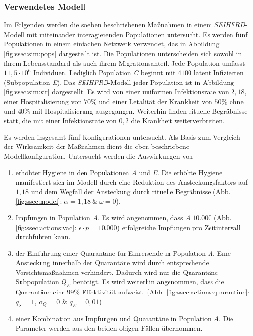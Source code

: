 \subsubsection{Verwendetes Modell}
Im Folgenden werden die soeben beschriebenen Maßnahmen in einem \emph{SEIHFRD}-Modell mit miteinander interagierenden Populationen untersucht. Es werden fünf Populationen in einem einfachen Netzwerk verwendet, das in Abbildung \ref{fig:ssec:sim:pops} dargestellt ist. Die Populationen unterscheiden sich sowohl in ihrem Lebensstandard als auch ihrem Migrationsanteil. Jede Population umfasst $11,5\cdot 10^6$ Individuen. Lediglich Population \emph{C} beginnt mit $4100$ latent Infizierten (Subpopulation \emph{E}). Das \emph{SEIHFRD}-Modell jeder Population ist in Abbildung \ref{fig:ssec:sim:sir} dargestellt. Es wird von einer uniformen Infektionsrate von $2,18$, einer Hospitalisierung von $70\%$ und einer Letalität der Krankheit von $50\%$ ohne und $40\%$ mit Hospitalisierung ausgegangen. Weiterhin finden rituelle Begräbnisse statt, die mit einer Infektionsrate von $0,2$ die Krankheit weiterverbreiten.

Es werden insgesamt fünf Konfigurationen untersucht. Als Basis zum Vergleich der Wirksamkeit der Maßnahmen dient die eben beschriebene Modellkonfiguration. Untersucht werden die Auswirkungen von 
\begin{enumerate}
\item erhöhter Hygiene in den Populationen \emph{A} und \emph{E}. Die erhöhte Hygiene manifestiert sich im Modell durch eine Reduktion des Ansteckungsfaktors auf $1,18$ und dem Wegfall der Ansteckung durch rituelle Begräbnisse (Abb. \ref{fig:ssec:model}: $\alpha = 1,18~\&~\omega = 0$).
\item Impfungen in Population \emph{A}. Es wird angenommen, dass \emph{A} $10.000$ (Abb. \ref{fig:ssec:actions:vac}: $\epsilon\cdot p = 10.000$) erfolgreiche Impfungen pro Zeitintervall durchführen kann. 
\item der Einführung einer Quarantäne für Einreisende in Population \emph{A}. Eine Ansteckung innerhalb der Quarantäne wird durch entsprechende Vorsichtsmaßnahmen verhindert. Dadurch wird nur die Quarantäne-Subpopulation $Q_E$ benötigt. Es wird weiterhin angenommen, dass die Quarantäne eine $99\%$ Effektivität aufweist. (Abb. \ref{fig:ssec:actions:quarantine}: $q_S=1$, $\alpha_Q=0$ \& $q_E=0,01$)
\item einer Kombination aus Impfungen und Quarantäne in Population $A$. Die Parameter werden aus den beiden obigen Fällen übernommen.
\end{enumerate}

